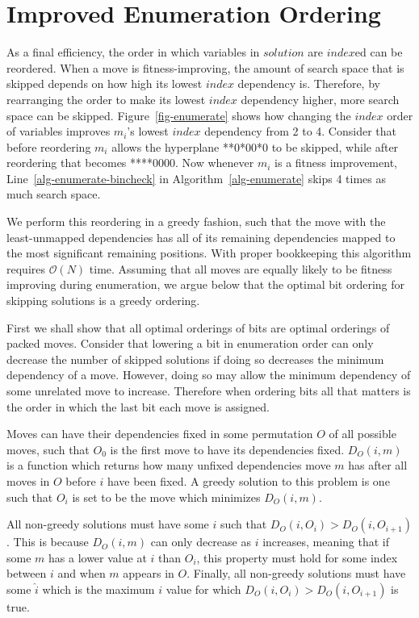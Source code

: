 \documentclass[runningheads,a4paper]{llncs}
\newcommand{\BigO}[1]{$\mathcal{O}{(#1)}$}
\begin{document}
\section{Improved Enumeration Ordering}
As a final efficiency, the order in which variables in $solution$ are $index$ed can be reordered.
When a move is fitness-improving,
the amount of search space that is skipped depends on how high its lowest $index$ dependency is. Therefore,
by rearranging the order to make its lowest $index$ dependency higher, more search space can be skipped. 
Figure~\ref{fig-enumerate} shows how changing the $index$ order of variables
improves $m_i$'s lowest $index$ dependency from 2 to 4. Consider that before reordering $m_i$ allows the hyperplane
**0*00*0 to be skipped, while after reordering that becomes ****0000.
Now whenever $m_i$ is a fitness improvement, Line~\ref{alg-enumerate-bincheck} in Algorithm~\ref{alg-enumerate}
skips 4 times as much search space.

We perform this reordering in a greedy fashion, such that the move with the
least-unmapped dependencies has all of its remaining dependencies mapped to the
most significant remaining positions. With proper bookkeeping this algorithm requires
\BigO{N} time. Assuming that all moves are equally likely to be fitness improving
during enumeration, we argue below that the optimal bit ordering for skipping solutions is a greedy
ordering.

First we shall show that all optimal orderings of bits are optimal orderings of packed moves.
Consider that lowering a bit in enumeration order can only decrease the number of skipped
solutions if doing so decreases the minimum dependency of a move. However, doing so may
allow the minimum dependency of some unrelated move to increase. Therefore when ordering
bits all that matters is the order in which the last bit each move is assigned.

Moves can have their dependencies fixed in some permutation $O$ of all possible moves,
such that $O_0$ is the first move to have its dependencies fixed.
$D_O(i, m)$ is a function which returns how many unfixed dependencies move $m$ has after all
moves in $O$ before $i$ have been fixed. A greedy solution to this problem is one such
that $O_i$ is set to be the move which minimizes $D_O(i, m)$.

All non-greedy solutions must have some $i$ such that $D_O(i, O_i) > D_O(i, O_{i+1})$.
This is because $D_O(i, m)$ can only decrease as $i$ increases, meaning that if some $m$
has a lower value at $i$ than $O_i$, this property must hold for
some index between $i$ and when $m$ appears in $O$.
Finally, all non-greedy solutions must have some $\hat{i}$
which is the maximum $i$ value for which $D_O(i, O_i) > D_O(i, O_{i+1})$ is true. 
\end{document}
